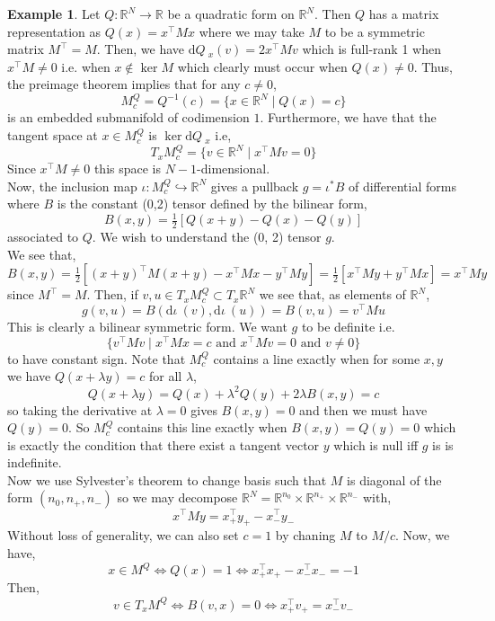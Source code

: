 \documentclass[12pt]{extarticle}
\newcommand{\R}{\mathbb{R}}
\renewcommand{\d}[1]{ \mathrm{d}#1 \:}
\theoremstyle{definition}
\newtheorem{example}[theorem]{Example}
\newcommand{\embed}{\hookrightarrow}
\begin{document}
\begin{example}
Let $Q : \R^N \to \R$ be a quadratic form on $\R^N$. Then $Q$ has a matrix representation as $Q(x) = x^\top M x$ where we may take $M$ to be a symmetric matrix $M^\top = M$. Then, we have $\d{Q}_x(v) = 2 x^\top M v$ which is full-rank 1 when $x^\top M \neq 0$ i.e. when $x \notin \ker{M}$ which clearly must occur when $Q(x) \neq 0$. Thus, the preimage theorem implies that for any $c \neq 0$,
\[ M^Q_c = Q^{-1}(c) = \{ x \in \R^N \mid Q(x) = c \} \]
is an embedded submanifold of codimension $1$. Furthermore, we have that the tangent space at $x \in M^Q_c$ is $\ker{\d{Q}_x}$ i.e,
\[ T_x M^Q_c = \{ v \in \R^N \mid x^\top M v = 0 \} \]
Since $x^\top M \neq 0$ this space is $N - 1$-dimensional. 
\bigskip\\
Now, the inclusion map $\iota : M_c^Q \embed \R^N$ gives a pullback $g = \iota^* B$ of differential forms where $B$ is the constant (0,2) tensor defined by the bilinear form,
\[ B(x,y) = \tfrac{1}{2} [ Q(x + y) - Q(x) - Q(y) ] \]
associated to $Q$. We wish to understand the (0, 2) tensor $g$. 
\bigskip\\
We see that,
\[ B(x, y) = \tfrac{1}{2} [ (x + y)^\top M (x + y) - x^\top M x - y^\top M y ] = \tfrac{1}{2} [x^\top M y + y^\top M x] = x^\top M y \]
since $M^\top = M$. Then, if $v,u \in T_x M^Q_c \subset T_x \R^N$ we see that, as elements of $\R^N$,
\[ g(v,u) = B(\d{\iota} (v), \d{\iota} (u)) = B(v, u) = v^\top M u \]
This is clearly a bilinear symmetric form. We want $g$ to be definite i.e.
\[ \{ v^\top M v \mid x^\top M x = c \text{ and } x^\top M v = 0 \text{ and } v \neq 0 \} \] 
to have constant sign. Note that $M^Q_c$ contains a line exactly when for some $x, y$ we have $Q(x + \lambda y) = c$ for all $\lambda$,
\[ Q(x + \lambda y) = Q(x) + \lambda^2 Q(y) + 2 \lambda B(x, y) = c \]
so taking the derivative at $\lambda = 0$ gives $B(x, y) = 0$ and then we must have $Q(y) = 0$. So $M^Q_c$ contains this line exactly when $B(x, y) = Q(y) = 0$ which is exactly the condition that there exist a tangent vector $y$ which is null iff $g$ is is indefinite.
\bigskip\\
Now we use Sylvester's theorem to change basis such that $M$ is diagonal of the form $(n_0, n_+, n_{-})$ so we may decompose $\R^N = \R^{n_0} \times \R^{n_+} \times \R^{n_-}$ with,
\[ x^\top M y = x^\top_+ y_+ - x^\top_- y_- \]
Without loss of generality, we can also set $c = 1$ by chaning $M$ to $M / c$. Now, we have,
\[ x \in M^Q \iff Q(x) = 1 \iff x_+^\top x_+ - x_-^\top x_- = -1 \]
Then,
\[ v \in T_x M^Q \iff B(v, x) = 0 \iff x^\top_+ v_+ = x^\top_- v_- \]

\end{example}
\end{document}
